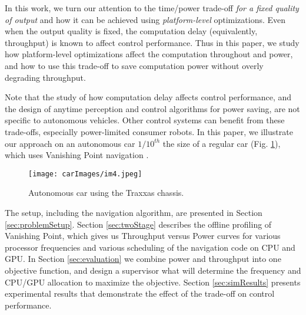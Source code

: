 In this work, we turn our attention to the time/power trade-off \emph{for a fixed quality of output} and how it can be achieved using \emph{platform-level} optimizations.
Even when the output quality is fixed, the computation delay (equivalently, throughput) is known to affect control performance. 
Thus in this paper, we study how platform-level optimizations affect the computation throughout and power, and how to use this trade-off to save computation power without overly degrading throughput.

Note that the study of how computation delay affects control performance, and the design of anytime perception and control algorithms for power saving, are not specific to autonomous vehicles.
Other control systems can benefit from these trade-offs, especially power-limited consumer robots.
In this paper, we illustrate our approach on an autonomous car $1/10^{th}$ the size of a regular car (Fig. \ref{fig:traxxas}), which uses Vanishing Point navigation \cite{VP1}.
\begin{figure}[t]
	\centering
	\texttt{[image: carImages/im4.jpeg]}
	\caption{Autonomous car using the Traxxas chassis.}
		\label{fig:traxxas}
\end{figure}  
The setup, including the navigation algorithm, are presented in Section \ref{sec:problemSetup}.
Section \ref{sec:twoStage} describes the offline profiling of Vanishing Point, which gives us Throughput versus Power curves for various processor frequencies and various scheduling of the navigation code on CPU and GPU.
In Section \ref{sec:evaluation} we combine power and throughput into one objective function, and design a supervisor what will determine the frequency and CPU/GPU allocation to maximize the objective.
Section \ref{sec:simResults} presents experimental results that demonstrate the effect of the trade-off on control performance.

